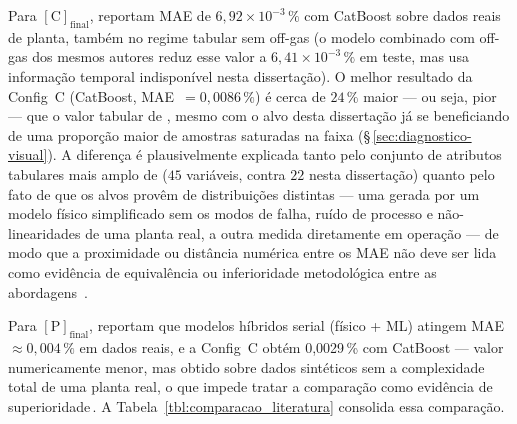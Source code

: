 Para $[\text{C}]_\text{final}$,  reportam MAE de $6{,}92\times10^{-3}\,\%$ com CatBoost sobre dados reais de planta, também no regime tabular sem off-gas (o modelo combinado com off-gas dos mesmos autores reduz esse valor a $6{,}41\times10^{-3}\,\%$ em teste, mas usa informação temporal indisponível nesta dissertação). O melhor resultado da Config~C (CatBoost, MAE~$= 0{,}0086\,\%$) é cerca de $24\,\%$ maior --- ou seja, pior --- que o valor tabular de , mesmo com o alvo desta dissertação já se beneficiando de uma proporção maior de amostras saturadas na faixa (\S\,\ref{sec:diagnostico-visual}). A diferença é plausivelmente explicada tanto pelo conjunto de atributos tabulares mais amplo de  ($45$ variáveis, contra $22$ nesta dissertação) quanto pelo fato de que os alvos provêm de distribuições distintas --- uma gerada por um modelo físico simplificado sem os modos de falha, ruído de processo e não-linearidades de uma planta real, a outra medida diretamente em operação --- de modo que a proximidade ou distância numérica entre os MAE não deve ser lida como evidência de equivalência ou inferioridade metodológica entre as abordagens~\cite{shao2024hybrid}.

Para $[\text{P}]_\text{final}$,  reportam que modelos híbridos serial (físico + ML) atingem MAE $\approx 0{,}004\,\%$ em dados reais, e a Config~C obtém 0{,}0029\,\% com CatBoost --- valor numericamente menor, mas obtido sobre dados sintéticos sem a complexidade total de uma planta real, o que impede tratar a comparação como evidência de superioridade\,\cite{buggineni2024synthetic}. A Tabela~\ref{tbl:comparacao_literatura} consolida essa comparação.

